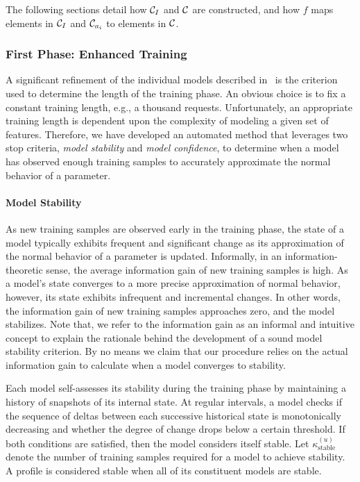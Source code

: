 The following sections detail how $\mathcal{C}_I$ and $\mathcal{C}$ are constructed, and how $f$ maps elements in $\mathcal{C}_I$ and $\mathcal{C}_{a_i}$ to elements in $\mathcal{C}$.

\subsubsection{First Phase: Enhanced Training}
\label{web:longtail:design:enhanced-training}
A significant refinement of the individual models described in~\citep{kruegel:jcn2005:webanomaly} is the criterion used to determine the length of the training phase.  An obvious choice is to fix a constant training length, e.g., a thousand requests.  Unfortunately, an appropriate training length is dependent upon the complexity of modeling a given set of features.  Therefore, we have developed an automated method that leverages two stop criteria, \emph{model stability} and \emph{model confidence}, to determine when a model has observed enough training samples to accurately approximate the normal behavior of a parameter.

\paragraph{Model Stability}
\label{web:longtail:design:enhanced-training:stability}
As new training samples are observed early in the training phase, the
state of a model typically exhibits frequent and significant change as
its approximation of the normal behavior of a parameter is updated.
Informally, in an information-theoretic sense, the average information
gain of new training samples is high.  As a model's state converges to
a more precise approximation of normal behavior, however, its state
exhibits infrequent and incremental changes.  In other words, the
information gain of new training samples approaches zero, and the
model stabilizes. Note that, we refer to the information gain as an
informal and intuitive concept to explain the rationale behind the
development of a sound model stability criterion. By no means we claim
that our procedure relies on the actual information gain to calculate
when a model converges to stability.

Each model self-assesses its stability during the training phase by maintaining a history of snapshots of its internal state.  At regular intervals, a model checks if the sequence of deltas between each successive historical state is monotonically decreasing and whether the degree of change drops below a certain threshold.  If both conditions are satisfied, then the model considers itself stable.  Let $\kappa_{\text{stable}}^{\left(u\right)}$ denote the number of training samples required for a model to achieve stability.  A profile is considered stable when all of its constituent models are stable.

